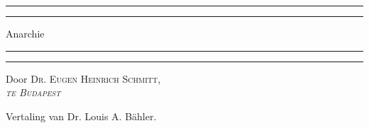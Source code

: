 \documentclass[a4paper, 12pt, oneside, dutch]{article}
\begin{document}
\renewcommand\thefootnote{\Fontauri{\arabic{footnote}}}
\let\oldfootnote\footnote
    \renewcommand{\footnote}[1]{\oldfootnote{\Fontauri\large#1}}
\begin{titlepage} %
	\centering %
	\scshape %

	
	\rule{\textwidth}{1.6pt}\vspace*{-\baselineskip}\vspace*{2pt} %
	\rule{\textwidth}{0.4pt} %
	
	\vspace{0.75\baselineskip} %

        {\Huge Anarchie \\} %
	
	\vspace{0.75\baselineskip} %
	
	\rule{\textwidth}{0.4pt}\vspace*{-\baselineskip}\vspace{3.2pt} %
	\rule{\textwidth}{1.6pt} %
	
	\vspace{1\baselineskip} %
	
	
	{Door \scshape\Large Dr. Eugen Heinrich Schmitt,\\\emph{te Budapest} \\} %
	
	\vspace*{1\baselineskip} %
	


	\vspace{1\baselineskip} %

        {\small Vertaling van Dr. Louis A. Bähler.}


\end{titlepage}
\end{document}
